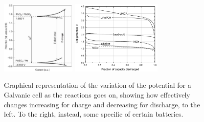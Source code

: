 \begin{figure}[t]
    \centering
    \includegraphics[width=0.33\textwidth]{Immagini/CellPotVar.png}
    \includegraphics[width=0.4\textwidth]{Immagini/CellSpec.png}
    \caption{
        Graphical representation of the variation of the potential for a Galvanic cell as the reactions goes on, showing how effectively changes increasing for charge and decreasing for discharge, to the left. To the right, instead, some specific of certain batteries.
    }
    \label{fig:CellSpec}
\end{figure}

